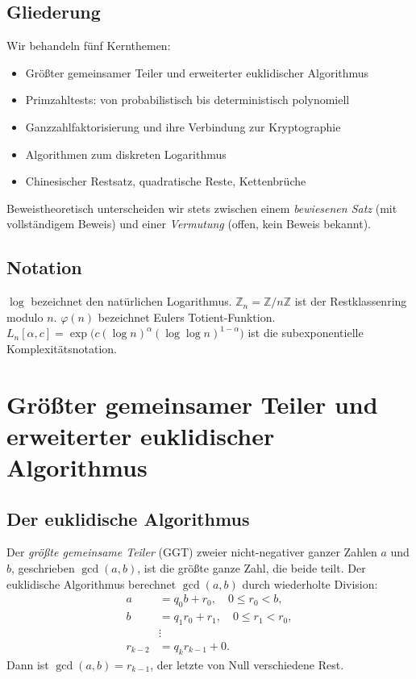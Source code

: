 \documentclass[12pt,a4paper]{amsart}
\theoremstyle{definition}
\begin{document}
\subsection*{Gliederung}

Wir behandeln fünf Kernthemen:
\begin{itemize}[leftmargin=2em]
  \item Größter gemeinsamer Teiler und erweiterter euklidischer Algorithmus
  \item Primzahltests: von probabilistisch bis deterministisch polynomiell
  \item Ganzzahlfaktorisierung und ihre Verbindung zur Kryptographie
  \item Algorithmen zum diskreten Logarithmus
  \item Chinesischer Restsatz, quadratische Reste, Kettenbrüche
\end{itemize}
Beweistheoretisch unterscheiden wir stets zwischen einem \emph{bewiesenen Satz}
(mit vollständigem Beweis) und einer \emph{Vermutung} (offen, kein Beweis bekannt).

\subsection*{Notation}

$\log$ bezeichnet den natürlichen Logarithmus. $\mathbb{Z}_n = \mathbb{Z}/n\mathbb{Z}$
ist der Restklassenring modulo $n$. $\varphi(n)$ bezeichnet Eulers Totient-Funktion.
$L_n[\alpha, c] = \exp\bigl(c(\log n)^\alpha(\log\log n)^{1-\alpha}\bigr)$ ist
die subexponentielle Komplexitätsnotation.

\section{Größter gemeinsamer Teiler und erweiterter euklidischer Algorithmus}

\subsection{Der euklidische Algorithmus}

Der \emph{größte gemeinsame Teiler} (GGT) zweier nicht-negativer ganzer Zahlen
$a$ und $b$, geschrieben $\gcd(a,b)$, ist die größte ganze Zahl, die beide teilt.
Der euklidische Algorithmus berechnet $\gcd(a,b)$ durch wiederholte Division:
\begin{align*}
  a &= q_0 b + r_0, \quad 0 \le r_0 < b,\\
  b &= q_1 r_0 + r_1, \quad 0 \le r_1 < r_0,\\
  &\vdots\\
  r_{k-2} &= q_k r_{k-1} + 0.
\end{align*}
Dann ist $\gcd(a,b) = r_{k-1}$, der letzte von Null verschiedene Rest.
\end{document}
